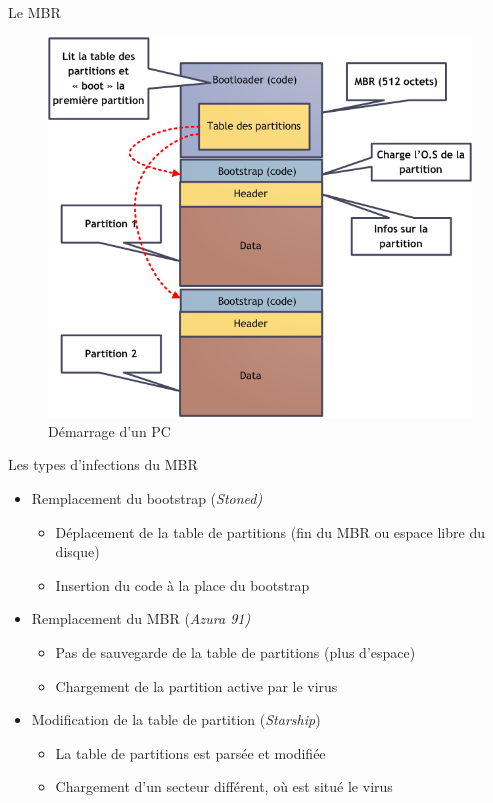 \documentclass{beamer}
\begin{document}
\begin{frame}{Le MBR}
\begin{figure}[!ht]
\includegraphics[scale=0.3]{boot.png}
\center
\caption{Démarrage d'un PC}
\end{figure}
\end{frame}


\begin{frame}{Les types d'infections du MBR}
\begin{itemize}
\item Remplacement du bootstrap (\textit{Stoned)}
\begin{itemize}
\item Déplacement de la table de partitions (fin du MBR ou espace libre du disque)
\item Insertion du code à la place du bootstrap
\end{itemize}
\item Remplacement du MBR (\textit{Azura 91)}
\begin{itemize}
\item Pas de sauvegarde de la table de partitions (plus d'espace)
\item Chargement de la partition active par le virus
\end{itemize}
\item Modification de la table de partition (\textit{Starship})
\begin{itemize}
\item La table de partitions est parsée et modifiée
\item Chargement d'un secteur différent, où est situé le virus
\end{itemize}
\end{itemize}
\end{frame}
\end{document}
